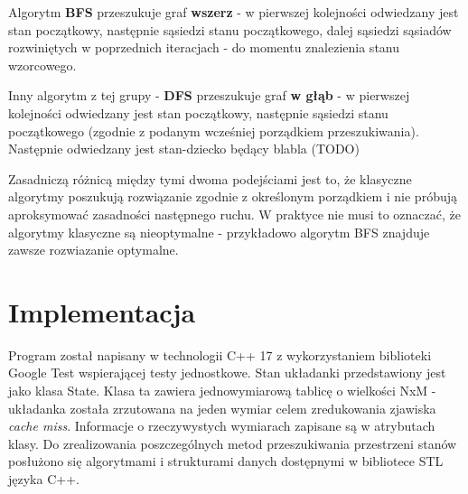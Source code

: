 \documentclass[11pt]{article}
\begin{document}
Algorytm \textbf{BFS} przeszukuje graf \textbf{wszerz} - w pierwszej
kolejności odwiedzany jest stan początkowy, następnie sąsiedzi stanu
początkowego, dalej sąsiedzi sąsiadów rozwiniętych w poprzednich
iteracjach - do momentu znalezienia stanu wzorcowego.

Inny algorytm z tej grupy - \textbf{DFS} przeszukuje graf \textbf{w
głąb} - w pierwszej kolejności odwiedzany jest stan początkowy,
następnie sąsiedzi stanu początkowego (zgodnie z podanym wcześniej
porządkiem przeszukiwania). Następnie odwiedzany jest stan-dziecko
będący blabla (TODO)

Zasadniczą różnicą między tymi dwoma podejściami jest to, że klasyczne
algorytmy poszukują rozwiązanie zgodnie z określonym porządkiem i nie
próbują aproksymować zasadności następnego ruchu. W praktyce nie musi to
oznaczać, że algorytmy klasyczne są nieoptymalne - przykładowo algorytm
BFS znajduje zawsze rozwiazanie optymalne.

\hypertarget{implementacja}{%
\section{Implementacja}\label{implementacja}}

Program został napisany w technologii C++ 17 z wykorzystaniem biblioteki
Google Test wspierającej testy jednostkowe. Stan układanki przedstawiony
jest jako klasa State. Klasa ta zawiera jednowymiarową tablicę o
wielkości NxM - układanka została zrzutowana na jeden wymiar celem
zredukowania zjawiska \emph{cache miss}. Informacje o rzeczywystych
wymiarach zapisane są w atrybutach klasy. Do zrealizowania
poszczególnych metod przeszukiwania przestrzeni stanów posłużono się
algorytmami i strukturami danych dostępnymi w bibliotece STL języka C++.
\end{document}
